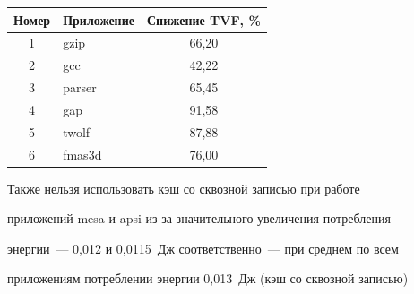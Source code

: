 \begin{table}[b]\small %


\vspace*{-15pt}


\begin{center}


\parbox{220pt}{





}





\vspace*{2ex}





\tabcolsep=8pt


\begin{tabular}{|c|l|c|}


\hline


Номер & Приложение&Снижение TVF, \%\\


\hline


1&gzip&66,20\\


2&gcc&42,22\\


3&parser&65,45\\


4&gap&91,58\\


5&twolf&87,88\\


6&fmas3d&76,00\\


\hline


\end{tabular}


\end{center}


\end{table}





      Также нельзя использовать кэш  со сквозной записью при работе 


приложений mesa и apsi  из-за значительного увеличения потребления 


энергии~--- 0,012 и 0,0115~Дж соответственно~--- при среднем по всем 


приложениям потреблении энергии 0,013~Дж (кэш  со сквозной записью) 


